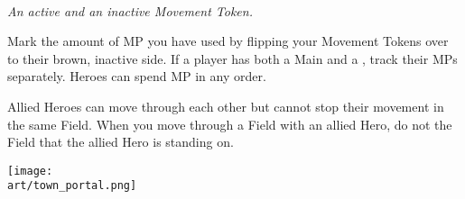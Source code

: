 \begin{multicols*}{2}
\begin{center}
  \\
  \medskip
  \footnotesize\textit{An active and an inactive Movement Token.}
\end{center}

\bigskip

Mark the amount of MP you have used by flipping your Movement Tokens over to their brown, inactive side.
If a player has both a Main and a , track their MPs separately.
Heroes can spend MP in any order.\par
Allied Heroes can move through each other but cannot stop their movement in the same Field.
When you move through a Field with an allied Hero, do not  the Field that the allied Hero is standing on.\par


\vfill
\begin{center}
  \texttt{[image: \\art/town\_portal.png]}
\end{center}

\clearpage


\end{multicols*}
